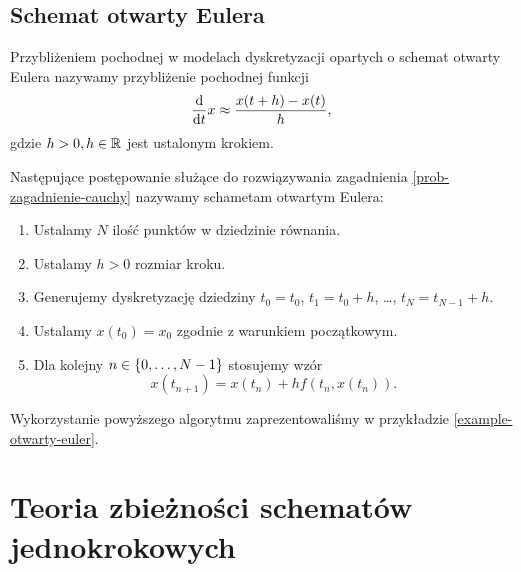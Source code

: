 \documentclass[12pt,a4paper]{report}
\begin{document}
\subsection{Schemat otwarty Eulera}

\begin{definition}
Przybliżeniem pochodnej w modelach dyskretyzacji opartych o schemat otwarty Eulera nazywamy przybliżenie pochodnej funkcji
$$
\frac{\mathrm{d} {} }{\mathrm{d}{t}}x \approx \frac{x(t+h) - x(t)}{h},
$$
gdzie $h >0, h \in \mathbb{R} $ jest ustalonym krokiem. 
\end{definition}

\begin{algorithm}
Następujące postępowanie służące do rozwiązywania zagadnienia \ref{prob-zagadnienie-cauchy} nazywamy schametam otwartym Eulera:
\begin{enumerate}
\item Ustalamy $N$ ilość punktów w dziedzinie równania. 
\item Ustalamy $h>0$ rozmiar kroku.
\item Generujemy dyskretyzację dziedziny $t_0 = t_0$, $t_1 = t_0 + h$, \ldots, $t_N = t_{N-1}+h$. 
\item Ustalamy $x(t_0) = x_0$ zgodnie z warunkiem początkowym.
\item Dla kolejny $n \in \left\lbrace {0, \ldots, N-1} \right\rbrace$ stosujemy wzór
$$
x(t_{n+1}) = x(t_n) + h f(t_n, x(t_n)).
$$
\end{enumerate}
\end{algorithm}

Wykorzystanie powyższego algorytmu zaprezentowaliśmy w przykładzie \ref{example-otwarty-euler}.

\section{Teoria zbieżności schematów jednokrokowych}
\end{document}
